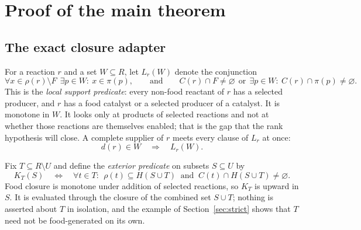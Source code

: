 \documentclass[11pt,a4paper]{article}
\theoremstyle{plain}
\theoremstyle{definition}
\theoremstyle{remark}
\begin{document}
\section{Proof of the main theorem}\label{sec:proof}

\subsection{The exact closure adapter}\label{sec:adapter}

For a reaction $r$ and a set $W\subseteq R$, let $L_r(W)$ denote the conjunction
\begin{equation}\label{eq:local}
 \forall x\in\rho(r)\setminus F\ \ \exists p\in W:\ x\in\pi(p),
 \qquad\text{and}\qquad
 C(r)\cap F\ne\varnothing\ \ \text{or}\ \ \exists p\in W:\ C(r)\cap\pi(p)\ne\varnothing .
\end{equation}
This is the \emph{local support predicate}: every non-food reactant of $r$ has a selected producer, and $r$ has a food catalyst or a selected producer of a catalyst. It is monotone in $W$. It looks only at products of selected reactions and not at whether those reactions are themselves enabled; that is the gap that the rank hypothesis will close. A complete supplier of $r$ meets every clause of $L_r$ at once:
\begin{equation}\label{eq:supplier-local}
 d(r)\in W\quad\Longrightarrow\quad L_r(W).
\end{equation}

Fix $T\subseteq R\setminus U$ and define the \emph{exterior predicate} on subsets $S\subseteq U$ by
\begin{equation}\label{eq:exterior}
 K_T(S)\quad\Longleftrightarrow\quad
 \forall t\in T:\ \ \rho(t)\subseteq H(S\cup T)\ \text{ and }\ C(t)\cap H(S\cup T)\ne\varnothing .
\end{equation}
Food closure is monotone under addition of selected reactions, so $K_T$ is upward in $S$. It is evaluated through the closure of the combined set $S\cup T$; nothing is asserted about $T$ in isolation, and the example of Section~\ref{sec:strict} shows that $T$ need not be food-generated on its own.
\end{document}
